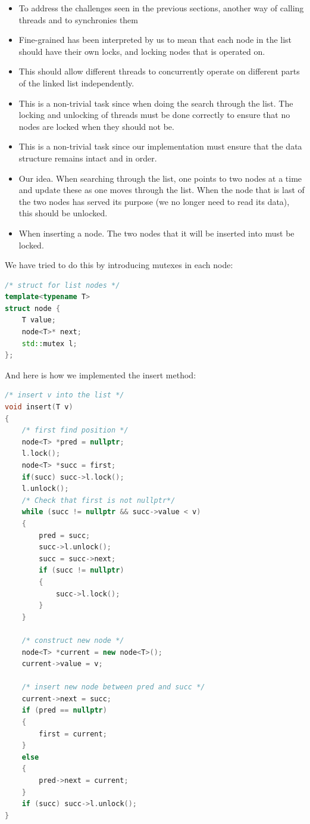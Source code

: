 \begin{itemize}
	\item To address the challenges seen in the previous sections, another way 
	of calling threads and to synchronies them
	\item Fine-grained has been interpreted by us to mean that each node in the 
	list should have their own locks, and locking nodes that is operated on.
	\item This should allow different threads to concurrently operate on different
	parts of the linked list independently.
	\item This is a non-trivial task since when doing the search through the list.
	The locking and unlocking of threads must be done correctly to ensure that no
	nodes are locked when they should not be.
	\item This is a non-trivial task since our implementation must ensure that
	the data structure remains intact and in order. 
	\item Our idea. When searching through the list, one points to two nodes at 
	a time and update these as one moves through the list. When the node that 
	is last of the two nodes has served its purpose (we no longer need to read
	its data), this should be unlocked. 
	\item When inserting a node. The two nodes that it will be inserted into 
	must be locked.
\end{itemize}

We have tried to do this by introducing mutexes in each node:

\begin{lstlisting}[language=C++, caption=Node with lock]
/* struct for list nodes */
template<typename T>
struct node {
	T value;
	node<T>* next;
	std::mutex l;
};
\end{lstlisting}

And here is how we implemented the insert method:

\begin{lstlisting}[language=C++, caption=Fine grained insert method attempt]
/* insert v into the list */
void insert(T v)
{
	/* first find position */
	node<T> *pred = nullptr;
	l.lock();
	node<T> *succ = first;
	if(succ) succ->l.lock();
	l.unlock();
	/* Check that first is not nullptr*/
	while (succ != nullptr && succ->value < v)
	{
		pred = succ;
		succ->l.unlock();
		succ = succ->next;
		if (succ != nullptr)
		{
			succ->l.lock();
		}
	}

	/* construct new node */
	node<T> *current = new node<T>();
	current->value = v;

	/* insert new node between pred and succ */
	current->next = succ;
	if (pred == nullptr)
	{
		first = current;
	}
	else
	{
		pred->next = current;
	}
	if (succ) succ->l.unlock();
}
\end{lstlisting}


